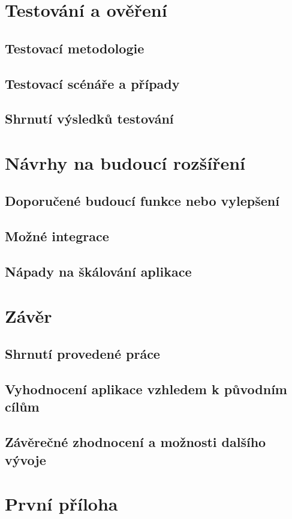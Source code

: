 \documentclass[12pt,a4paper]{report}
\begin{document}
\chapter{Testování a ověření}
\section{Testovací metodologie}
\section{Testovací scénáře a případy}
\section{Shrnutí výsledků testování}

\chapter{Návrhy na budoucí rozšíření}
\section{Doporučené budoucí funkce nebo vylepšení}
\section{Možné integrace}
\section{Nápady na škálování aplikace}

\chapter{Závěr}
\section{Shrnutí provedené práce}
\section{Vyhodnocení aplikace vzhledem k původním cílům}
\section{Závěrečné zhodnocení a možnosti dalšího vývoje}

\appendix
\chapter{První příloha}

\printbibliography
\end{document}

